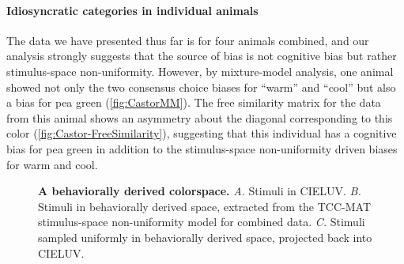 \paragraph{Idiosyncratic categories in individual animals}
The data we have presented thus far is for four animals combined, and our analysis strongly suggests that the source of bias is not cognitive bias but rather stimulus-space non-uniformity.
However, by mixture-model analysis, one animal showed not only the two consensus choice biases for “warm” and “cool” but also a bias for pea green (\autoref{fig:CastorMM}). 
The free similarity matrix for the data from this animal shows an asymmetry about the diagonal corresponding to this color (\autoref{fig:Castor-FreeSimilarity}), suggesting that this individual has a cognitive bias for pea green in addition to the stimulus-space non-uniformity driven biases for warm and cool.


\begin{figure}
    \centering
    \begin{subfigure}[t]{0.3\textwidth}
         \centering
         \caption{}
         
         \label{fig:CIELUV}
    \end{subfigure}
    \hfill
    \begin{subfigure}[t]{0.3\textwidth}
         \centering
         \caption{}
         
         \label{fig:MACBEHspace}
    \end{subfigure}
    \hfill
    \begin{subfigure}[t]{0.3\textwidth}
         \centering
         \caption{}
         
         \label{fig:UniformStimsInCIELUV}
    \end{subfigure}
           \caption{\textbf{A behaviorally derived colorspace.} 
           \emph{A.} Stimuli in CIELUV. 
           \emph{B.} Stimuli in behaviorally derived space, extracted from the TCC-MAT stimulus-space non-uniformity model for combined data. 
           \emph{C.} Stimuli sampled uniformly in behaviorally derived space, projected back into CIELUV.}
        \label{fig:MACBEHcolorspace}
    
\end{figure}


